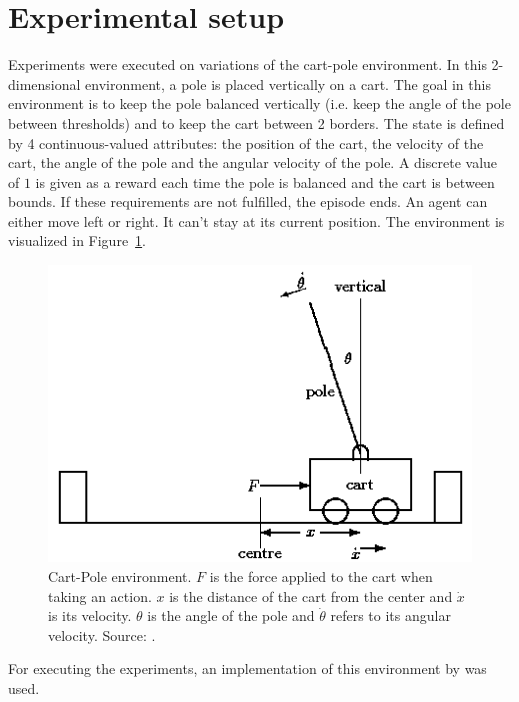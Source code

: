 \documentclass[a4paper, 11pt]{article}
\begin{document}
\section{Experimental setup}
Experiments were executed on variations of the cart-pole environment.
In this 2-dimensional environment, a pole is placed vertically on a cart. The goal in this environment is to keep the pole balanced vertically (i.e. keep the angle of the pole between thresholds) and to keep the cart between 2 borders.
The state is defined by 4 continuous-valued attributes: the position of the cart, the velocity of the cart, the angle of the pole and the angular velocity of the pole. A discrete value of $1$ is given as a reward each time the pole is balanced and the cart is between bounds. If these requirements are not fulfilled, the episode ends. An agent can either move left or right. It can't stay at its current position. The environment is visualized in Figure~\ref{fig:cartpole}.
\begin{figure}[htb]
    \centering
    \includegraphics[width=.6\linewidth]{images/cartpole.png}
    \caption[Cart-Pole environment]{Cart-Pole environment. $F$ is the force applied to the cart when taking an action. $x$ is the distance of the cart from the center and $\dot{x}$ is its velocity. $\theta$ is the angle of the pole and $\dot{\theta}$ refers to its angular velocity. Source: \cite{grant1990modelling}.}
    \label{fig:cartpole}
\end{figure}
For executing the experiments, an implementation of this environment by \cite{Brockman2016OpenAIGym} was used.\\
\end{document}

